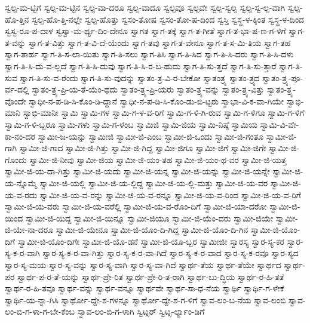 {ಸ್ವಲ್ಪ-ಮ-ಟ್ಟಿಗೆ
ಸ್ವಲ್ಪ-ಮ-ಟ್ಟಿನ
ಸ್ವಲ್ಪ-ವಾ-ದರೂ
ಸ್ವಲ್ಪ-ವಾದೂ
ಸ್ವಲ್ಪವೂ
ಸ್ವಲ್ಪವೇ
ಸ್ವಲ್ಪ-ಸ್ವಲ್ಪ
ಸ್ವಲ್ಪ-ಸ್ವ-ಲ್ಪ-ವಾಗಿ
ಸ್ವಲ್ಪ-ಹೊ-ತ್ತಿನ
ಸ್ವಲ್ಪ-ಹೊ-ತ್ತಿ-ನಲ್ಲೇ
ಸ್ವಲ್ಪ-ಹೊತ್ತು
ಸ್ವಸಂ-ತೋಷ
ಸ್ವಸಂ-ತೋ-ಷ-ದಿಂದ
ಸ್ವಸ್ತಿ
ಸ್ವಸ್ಥ-ಳ-ಕ್ಕಿಂತ
ಸ್ವಸ್ಥ-ಳ-ದಿಂದ
ಸ್ವಸ್ವ-ರೂ-ಪ-ದಾಳ
ಸ್ವಸ್ವಾ-ಮ-ರ್ಥ್ಯ-ದಿಂ-ದೇನೂ
ಸ್ವಾಗತ
ಸ್ವಾಗ-ತಕ್ಕೆ
ಸ್ವಾಗ-ತ-ಗೀತೆ
ಸ್ವಾಗ-ತ-ಭಾ-ಷ-ಣ-ಗ-ಳಿಗೆ
ಸ್ವಾಗ-ತ-ವನ್ನು
ಸ್ವಾಗ-ತ-ವಿತ್ತು
ಸ್ವಾಗ-ತ-ವಿ-ದೆ-ಯೆಂದು
ಸ್ವಾಗ-ತವು
ಸ್ವಾಗ-ತ-ವೇನೂ
ಸ್ವಾಗ-ತ-ಸ-ಮಿ-ತಿಯ
ಸ್ವಾಗ-ತಹ
ಸ್ವಾಗ-ತಾರ್ಹ
ಸ್ವಾಗ-ತಿ-ಸ-ಲಾ-ಯಿತು
ಸ್ವಾಗ-ತಿ-ಸಲು
ಸ್ವಾಗ-ತಿಸಿ
ಸ್ವಾಗ-ತಿ-ಸಿದ
ಸ್ವಾಗ-ತಿ-ಸಿ-ದರು
ಸ್ವಾಗ-ತಿ-ಸಿ-ದಳು
ಸ್ವಾಗ-ತಿ-ಸಿ-ದು-ವ-ಲ್ಲದೆ
ಸ್ವಾಗ-ತಿ-ಸಿ-ದುವು
ಸ್ವಾಗ-ತಿ-ಸಿ-ರ-ಬ-ಹುದು
ಸ್ವಾಗ-ತಿ-ಸು-ತ್ತದೆ
ಸ್ವಾಗ-ತಿ-ಸು-ತ್ತಾರೆ
ಸ್ವಾಗ-ತಿ-ಸುವ
ಸ್ವಾಗ-ತಿ-ಸು-ವ-ರೆಂದು
ಸ್ವಾಗ-ತಿ-ಸು-ವುದನ್ನು
ಸ್ವಾತಂ-ತ್ರ-ವಿ-ರ-ಬೇಕೋ
ಸ್ವಾತಂತ್ರ್ಯ
ಸ್ವಾತಂ-ತ್ರ್ಯದ
ಸ್ವಾತಂ-ತ್ರ್ಯ-ಪೂ-ರ್ವ-ದಲ್ಲಿ
ಸ್ವಾತಂ-ತ್ರ್ಯ-ಪ್ರಿ-ಯ-ತೆ-ಯೆಂ-ಥದು
ಸ್ವಾತಂ-ತ್ರ್ಯ-ಪ್ರಿ-ಯರು
ಸ್ವಾತಂ-ತ್ರ್ಯ-ವನ್ನು
ಸ್ವಾತಂ-ತ್ರ್ಯ-ವಿತ್ತು
ಸ್ವಾತಂ-ತ್ರ್ಯ-ವೊಂದೇ
ಸ್ವಾಧೀ-ನ-ಪ-ಡಿ-ಸಿ-ಕೊಂ-ಡಿ-ದ್ದಾನೆ
ಸ್ವಾಧೀ-ನ-ಪ-ಡಿ-ಸಿ-ಕೊಂ-ಡು-ಬಿ-ಟ್ಟರು
ಸ್ವಾಭಾ-ವಿ-ಕ-ವಾ-ಗಿಯೇ
ಸ್ವಾಭಿ-ಮಾನಿ
ಸ್ವಾಭಿ-ಮಾನೀ
ಸ್ವಾಮಿ
ಸ್ವಾಮಿ-ಗಳ
ಸ್ವಾಮಿ-ಗ-ಳ-ವ-ರಿಗೆ
ಸ್ವಾಮಿ-ಗ-ಳಿ-ಗಿ-ರುವ
ಸ್ವಾಮಿ-ಗ-ಳಿಗೂ
ಸ್ವಾಮಿ-ಗ-ಳಿಗೆ
ಸ್ವಾಮಿ-ಗ-ಳಿ-ಬ್ಬರೂ
ಸ್ವಾಮಿ-ಗಳು
ಸ್ವಾಮಿ-ಗ-ಳೆಂಬ
ಸ್ವಾಮಿಜಿ
ಸ್ವಾಮಿ-ಜಿಯ
ಸ್ವಾಮಿ-ನಿಷ್ಠೆ
ಸ್ವಾಮಿಯ
ಸ್ವಾಮಿ-ವಿ-ವೇ-ಕಾ-ನಂ-ದರ
ಸ್ವಾಮೀ-ಜ-ಯನ್ನು
ಸ್ವಾಮೀಜಿ
ಸ್ವಾಮೀ-ಜಿ-ಎಂಬ
ಸ್ವಾಮೀ-ಜಿ-ಒಂದು
ಸ್ವಾಮೀ-ಜಿ-ಗಂತೂ
ಸ್ವಾಮೀ-ಜಿ-ಗಾಗಿ
ಸ್ವಾಮೀ-ಜಿ-ಗಾದ
ಸ್ವಾಮೀ-ಜಿ-ಗಿತ್ತು
ಸ್ವಾಮೀ-ಜಿ-ಗಿದ್ದ
ಸ್ವಾಮೀ-ಜಿಗೂ
ಸ್ವಾಮೀ-ಜಿಗೆ
ಸ್ವಾಮೀ-ಜಿಗೇ
ಸ್ವಾಮೀ-ಜಿ-ಗೊಂದು
ಸ್ವಾಮೀ-ಜಿ-ನೀವು
ಸ್ವಾಮೀ-ಜಿಯ
ಸ್ವಾಮೀ-ಜಿ-ಯಂ-ತಹ
ಸ್ವಾಮೀ-ಜಿ-ಯಂ-ಥ-ವರ
ಸ್ವಾಮೀ-ಜಿ-ಯತ್ತ
ಸ್ವಾಮೀ-ಜಿ-ಯ-ದಾ-ಗಿತ್ತು
ಸ್ವಾಮೀ-ಜಿ-ಯದು
ಸ್ವಾಮೀ-ಜಿ-ಯನ್ನ
ಸ್ವಾಮೀ-ಜಿ-ಯನ್ನು
ಸ್ವಾಮೀ-ಜಿ-ಯನ್ನೇ
ಸ್ವಾಮೀ-ಜಿ-ಯ-ನ್ನೊಮ್ಮೆ
ಸ್ವಾಮೀ-ಜಿ-ಯಲ್ಲಿ
ಸ್ವಾಮೀ-ಜಿ-ಯ-ಲ್ಲಿದ್ದ
ಸ್ವಾಮೀ-ಜಿ-ಯ-ಲ್ಲಿ-ಮತ್ತು
ಸ್ವಾಮೀ-ಜಿ-ಯ-ವರ
ಸ್ವಾಮೀ-ಜಿ-ಯ-ವ-ರದು
ಸ್ವಾಮೀ-ಜಿ-ಯ-ವ-ರನ್ನು
ಸ್ವಾಮೀ-ಜಿ-ಯ-ವ-ರನ್ನೂ
ಸ್ವಾಮೀ-ಜಿ-ಯ-ವ-ರಿಂದ
ಸ್ವಾಮೀ-ಜಿ-ಯ-ವ-ರಿಗೆ
ಸ್ವಾಮೀ-ಜಿ-ಯ-ವರು
ಸ್ವಾಮೀ-ಜಿ-ಯ-ವರೆಲ್ಲಿ
ಸ್ವಾಮೀ-ಜಿ-ಯ-ವ-ರೊಂ-ದಿಗೆ
ಸ್ವಾಮೀ-ಜಿ-ಯಾ-ದರೋ
ಸ್ವಾಮೀ-ಜಿ-ಯಿಂದ
ಸ್ವಾಮೀ-ಜಿ-ಯಿದ್ದ
ಸ್ವಾಮೀ-ಜಿ-ಯಿನ್ನೂ
ಸ್ವಾಮೀ-ಜಿಯೂ
ಸ್ವಾಮೀ-ಜಿ-ಯೆಂ-ದರು
ಸ್ವಾಮೀ-ಜಿಯೇ
ಸ್ವಾಮೀ-ಜಿ-ಯೇ-ನಾ-ದರೂ
ಸ್ವಾಮೀ-ಜಿ-ಯೇನೂ
ಸ್ವಾಮೀ-ಜಿ-ಯೊಂ-ದಿ-ಗಿದ್ದ
ಸ್ವಾಮೀ-ಜಿ-ಯೊಂ-ದಿ-ಗಿನ
ಸ್ವಾಮೀ-ಜಿ-ಯೊಂ-ದಿಗೆ
ಸ್ವಾಮೀ-ಜಿ-ಯೊಂ-ದಿಗೇ
ಸ್ವಾಮೀ-ಜಿ-ಯೊ-ಡನೆ
ಸ್ವಾಮೀ-ಜಿ-ಯೊ-ಬ್ಬರ
ಸ್ವಾಮೀಜೀ
ಸ್ವಾರಸ್ಯ
ಸ್ವಾರ-ಸ್ಯ-ಕರ
ಸ್ವಾರ-ಸ್ಯ-ಕ-ರ-ವಾಗಿ
ಸ್ವಾರ-ಸ್ಯ-ಕ-ರ-ವಾ-ಗಿತ್ತು
ಸ್ವಾರ-ಸ್ಯ-ಕ-ರ-ವಾ-ಗಿದೆ
ಸ್ವಾರ-ಸ್ಯ-ಕ-ರ-ವಾದ
ಸ್ವಾರ-ಸ್ಯ-ಕ-ರವೂ
ಸ್ವಾರ-ಸ್ಯದ
ಸ್ವಾರ-ಸ್ಯ-ಮಯ
ಸ್ವಾರ-ಸ್ಯ-ವನ್ನು
ಸ್ವಾರ-ಸ್ಯ-ವಾಗಿ
ಸ್ವಾರ-ಸ್ಯ-ವಾ-ಗಿದೆ
ಸ್ವಾರ್ಥ-ತೆಯ
ಸ್ವಾರ್ಥ-ತೆಯೇ
ಸ್ವಾರ್ಥದ
ಸ್ವಾರ್ಥ-ಪರ
ಸ್ವಾರ್ಥ-ಪ-ರ-ತೆ-ಯನ್ನು
ಸ್ವಾರ್ಥ-ಪ್ರೇ-ರಿತ
ಸ್ವಾರ್ಥ-ಪ್ರೇ-ರಿ-ತ-ರಾಗಿ
ಸ್ವಾರ್ಥ-ಬು-ದ್ಧಿಯ
ಸ್ವಾರ್ಥ-ರ-ಹಿ-ತತೆ
ಸ್ವಾರ್ಥ-ರ-ಹಿ-ತವೂ
ಸ್ವಾರ್ಥ-ವನ್ನು
ಸ್ವಾರ್ಥ-ವನ್ನೂ
ಸ್ವಾರ್ಥವೇ
ಸ್ವಾರ್ಥ-ಸಾ-ಧ-ನೆಯ
ಸ್ವಾರ್ಥಿ
ಸ್ವಾರ್ಥಿ-ಗ-ಳೇಕೆ
ಸ್ವಾರ್ಥಿ-ಯ-ನ್ನಾ-ಗಿಸಿ
ಸ್ವಾರ್ಥೋ-ದ್ದೇ-ಶ-ಗಳನ್ನೂ
ಸ್ವಾರ್ಥೋ-ದ್ದೇ-ಶ-ಗ-ಳಿಗೆ
ಸ್ವಾವ-ಲಂ-ಬ-ನೆಯ
ಸ್ವಾವ-ಲಂಬಿ
ಸ್ವಾವ-ಲಂ-ಬಿ-ಗ-ಳಾ-ಗ-ಬೇ-ಕೆಂಬ
ಸ್ವಾವ-ಲಂ-ಬಿ-ಗ-ಳಾಗಿ
ಸ್ವಿಟ್ಸರ್
ಸ್ವಿಟ್ಸ-ರ್ಲ್ಯಾಂ-ಡಿಗೆ
}
